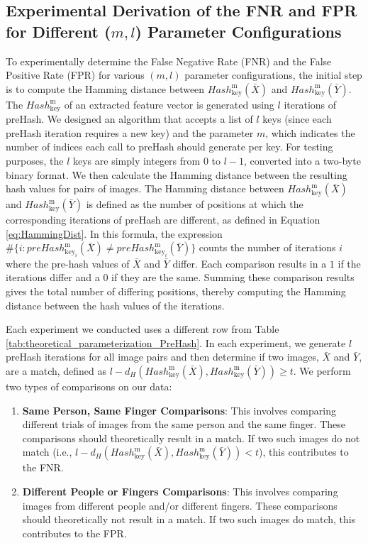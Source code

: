 \newpage
\subsection{Experimental Derivation of the FNR and FPR for Different (\(m, l\)) Parameter Configurations}

To experimentally determine the False Negative Rate (FNR) and the False Positive Rate (FPR) for various \((m, l)\) parameter configurations, the initial step is to compute the Hamming distance between \( Hash_{\text{key}}^\text{m}(\bar{X}) \) and \( Hash_{\text{key}}^\text{m}(\bar{Y}) \). The \( Hash_{\text{key}}^\text{m} \) of an extracted feature vector is generated using \( l \) iterations of preHash. We designed an algorithm that accepts a list of \( l \) keys (since each preHash iteration requires a new key) and the parameter \( m \), which indicates the number of indices each call to preHash should generate per key. For testing purposes, the \( l \) keys are simply integers from 0 to \( l-1 \), converted into a two-byte binary format. We then calculate the Hamming distance between the resulting hash values for pairs of images. The Hamming distance between \( Hash_{\text{key}}^\text{m}(\bar{X}) \) and \( Hash_{\text{key}}^\text{m}(\bar{Y}) \) is defined as the number of positions at which the corresponding iterations of preHash are different, as defined in Equation \ref{eq:HammingDist}. In this formula, the expression \( \# \{ i : preHash_{\text{key}_i}^\text{m}(\bar{X}) \neq preHash_{\text{key}_i}^\text{m}(\bar{Y}) \} \) counts the number of iterations \( i \) where the pre-hash values of \( \bar{X} \) and \( \bar{Y} \) differ. Each comparison results in a \(1\) if the iterations differ and a \(0\) if they are the same. Summing these comparison results gives the total number of differing positions, thereby computing the Hamming distance between the hash values of the iterations.


Each experiment we conducted uses a different row from Table \ref{tab:theoretical_parameterization_PreHash}. In each experiment, we generate \( l \) preHash iterations for all image pairs and then determine if two images, \(\bar{X}\) and \(\bar{Y}\), are a match, defined as \( l - d_H(Hash_{\text{key}}^\text{m}(\bar{X}), Hash_{\text{key}}^\text{m}(\bar{Y})) \geq t \). We perform two types of comparisons on our data:


\begin{enumerate}
    \item \textbf{Same Person, Same Finger Comparisons}: This involves comparing different trials of images from the same person and the same finger. These comparisons should theoretically result in a match. If two such images do not match (i.e., \( l - d_H(Hash_{\text{key}}^\text{m}(\bar{X}), Hash_{\text{key}}^\text{m}(\bar{Y})) < t \)), this contributes to the FNR.
    \item \textbf{Different People or Fingers Comparisons}: This involves comparing images from different people and/or different fingers. These comparisons should theoretically not result in a match. If two such images do match, this contributes to the FPR.
\end{enumerate}

